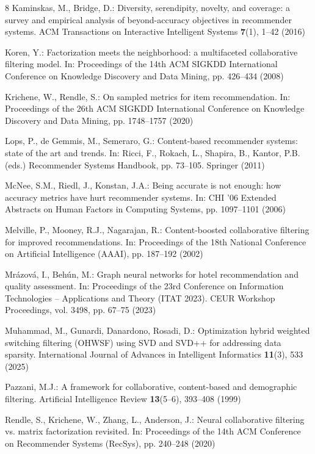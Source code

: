 \documentclass[runningheads]{llncs}
\begin{document}
\begin{thebibliography}{8}
Kaminskas, M., Bridge, D.: Diversity, serendipity, novelty, and coverage: a survey and empirical analysis of beyond-accuracy objectives in recommender systems. ACM Transactions on Interactive Intelligent Systems \textbf{7}(1), 1--42 (2016)

Koren, Y.: Factorization meets the neighborhood: a multifaceted collaborative filtering model. In: Proceedings of the 14th ACM SIGKDD International Conference on Knowledge Discovery and Data Mining, pp. 426--434 (2008)

Krichene, W., Rendle, S.: On sampled metrics for item recommendation. In: Proceedings of the 26th ACM SIGKDD International Conference on Knowledge Discovery and Data Mining, pp. 1748--1757 (2020)

Lops, P., de Gemmis, M., Semeraro, G.: Content-based recommender systems: state of the art and trends. In: Ricci, F., Rokach, L., Shapira, B., Kantor, P.B. (eds.) Recommender Systems Handbook, pp. 73--105. Springer (2011)

McNee, S.M., Riedl, J., Konstan, J.A.: Being accurate is not enough: how accuracy metrics have hurt recommender systems. In: CHI '06 Extended Abstracts on Human Factors in Computing Systems, pp. 1097--1101 (2006)

Melville, P., Mooney, R.J., Nagarajan, R.: Content-boosted collaborative filtering for improved recommendations. In: Proceedings of the 18th National Conference on Artificial Intelligence (AAAI), pp. 187--192 (2002)

Mr{\'a}zov{\'a}, I., Beh{\'u}n, M.: Graph neural networks for hotel recommendation and quality assessment. In: Proceedings of the 23rd Conference on Information Technologies -- Applications and Theory (ITAT 2023). CEUR Workshop Proceedings, vol. 3498, pp. 67--75 (2023)

Muhammad, M., Gunardi, Danardono, Rosadi, D.: Optimization hybrid weighted switching filtering (OHWSF) using SVD and SVD++ for addressing data sparsity. International Journal of Advances in Intelligent Informatics \textbf{11}(3), 533 (2025)

Pazzani, M.J.: A framework for collaborative, content-based and demographic filtering. Artificial Intelligence Review \textbf{13}(5--6), 393--408 (1999)

Rendle, S., Krichene, W., Zhang, L., Anderson, J.: Neural collaborative filtering vs. matrix factorization revisited. In: Proceedings of the 14th ACM Conference on Recommender Systems (RecSys), pp. 240--248 (2020)


\end{thebibliography}
\end{document}
